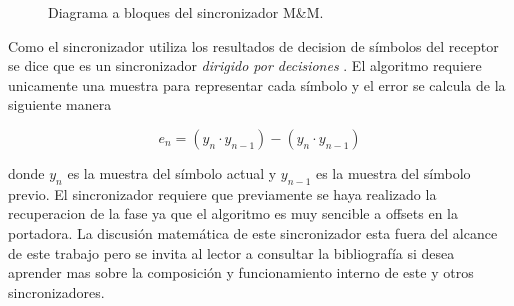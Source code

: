 \begin{figure}[htp]
  \centering
  \vspace{0.5in}
  \vspace{0.3in}
  \caption{Diagrama a bloques del sincronizador M\&M. \protect\cite{meyr}}
  \label{fig:mm}
\end{figure}

Como el sincronizador utiliza los resultados de decision de s\'imbolos del receptor se dice que es un sincronizador
\emph{dirigido por decisiones} \cite{louis}. El algoritmo requiere unicamente una muestra para representar cada s\'imbolo y el
error se calcula de la siguiente manera

\begin{equation}
e_n=(y_n \cdot y_{n-1}) - (y_n \cdot y_{n-1})
\end{equation}

donde $y_n$ es la muestra del s\'imbolo actual y $y_{n-1}$ es la muestra del s\'imbolo previo. El sincronizador requiere que
previamente se haya realizado la recuperacion de la fase ya que el algoritmo es muy sencible a offsets en la portadora. La
discusi\'on matem\'atica de este sincronizador esta fuera del alcance de este trabajo pero se invita al lector a consultar la
bibliograf\'ia si desea aprender mas sobre la composici\'on y funcionamiento interno de este y otros sincronizadores. 

